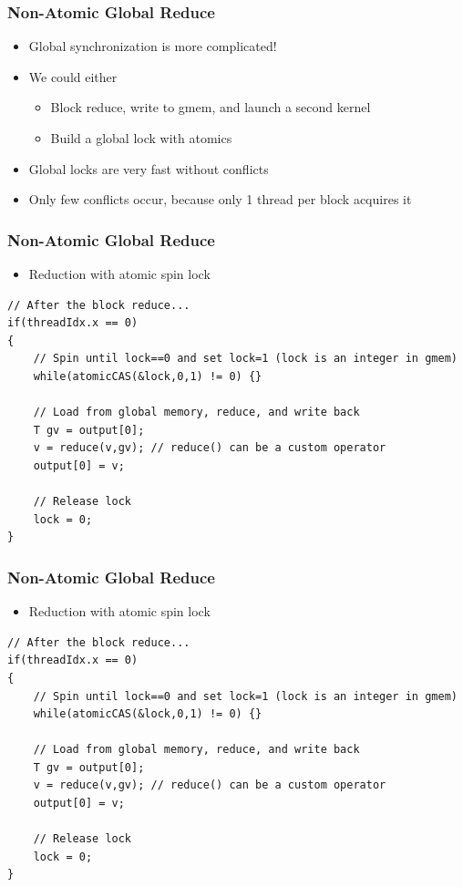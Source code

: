 \documentclass[aspectratio=169]{beamer}
\begin{document}
\begin{frame}[fragile]
\frametitle{Non-Atomic Global Reduce}
\begin{itemize}
	\item Global synchronization is more complicated!
	\item<2-> We could either
	\begin{itemize}
		\item Block reduce, write to gmem, and launch a second kernel
		\item Build a global lock with atomics
	\end{itemize}
	\item<3->[$\rightarrow$] Global locks are very fast without conflicts
	\item<4->[$\rightarrow$] Only few conflicts occur, because only 1 thread per block acquires it
\end{itemize}

\end{frame}


\begin{frame}[fragile]
\frametitle{Non-Atomic Global Reduce}
\label{si:spinlock}
\begin{itemize}
	\item Reduction with atomic spin lock
\end{itemize}
\begin{lstlisting}
// After the block reduce...
if(threadIdx.x == 0)
{
	// Spin until lock==0 and set lock=1 (lock is an integer in gmem)
	while(atomicCAS(&lock,0,1) != 0) {}
	
	// Load from global memory, reduce, and write back
	T gv = output[0];
	v = reduce(v,gv); // reduce() can be a custom operator
	output[0] = v;
	
	// Release lock
	lock = 0;
}
\end{lstlisting}
\end{frame}

\begin{frame}[fragile]
\frametitle{Non-Atomic Global Reduce}
\label{si:spinlock}
\begin{itemize}
	\item Reduction with atomic spin lock
\end{itemize}
\begin{lstlisting}
// After the block reduce...
if(threadIdx.x == 0)
{
	// Spin until lock==0 and set lock=1 (lock is an integer in gmem)
	while(atomicCAS(&lock,0,1) != 0) {}
	
	// Load from global memory, reduce, and write back
	T gv = output[0];
	v = reduce(v,gv); // reduce() can be a custom operator
	output[0] = v;
	
	// Release lock
	lock = 0;
}
\end{lstlisting}
\end{frame}
\end{document}
